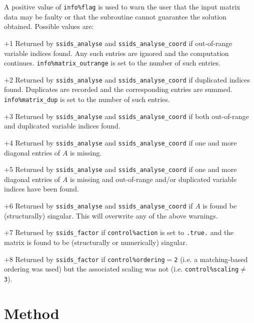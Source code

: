 \documentclass{spral}
\begin{document}
A positive value of {\tt info\%flag}
is used to warn the user that the input matrix data may be faulty or that
the subroutine cannot guarantee the solution obtained.
Possible values are:
\begin{description}
\item{$+$1} Returned by {\tt ssids\_analyse}
and {\tt ssids\_analyse\_coord} if out-of-range variable
indices found.
Any such entries are ignored  and the computation continues.
{\tt info\%matrix\_outrange} is set to the number of such entries.

\item{$+$2} Returned by {\tt ssids\_analyse} and {\tt ssids\_analyse\_coord}
if duplicated indices found. Duplicates are recorded and the corresponding
entries are summed. {\tt info\%matrix\_dup} is set to the number of such entries.

\item{$+$3} Returned by {\tt ssids\_analyse}  and {\tt ssids\_analyse\_coord} if both
out-of-range and duplicated variable indices found.

\item{$+$4} Returned by {\tt ssids\_analyse}  and {\tt ssids\_analyse\_coord}
if  one and more diagonal entries
of $A$ is missing.

\item{$+$5} Returned by {\tt ssids\_analyse}  and {\tt ssids\_analyse\_coord}
if  one and more diagonal entries
of $A$ is missing  and
out-of-range and/or duplicated variable indices have been found.

\item{$+$6} Returned by {\tt ssids\_analyse}  and {\tt ssids\_analyse\_coord} if
$A$ is found be (structurally) singular. This will overwrite any of the above warnings.

\item{$+$7} Returned by {\tt ssids\_factor} if {\tt control\%action} is set
to {\tt .true.} and the matrix is found to be (structurally or numerically)
singular.

\item{$+$8} Returned by {\tt ssids\_factor} if
{\tt control\%ordering}$=${\tt 2} (i.e.
a matching-based ordering was used) but the associated scaling was not (i.e. {\tt control\%scaling}$\ne$
{\tt 3}).

\end{description}

\section{Method} \label{method}
\end{document}
